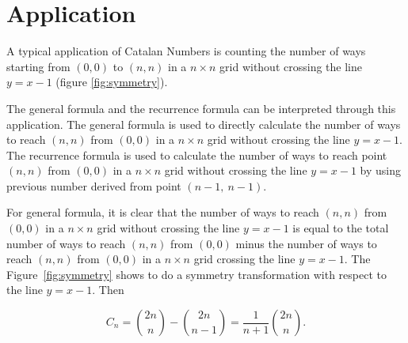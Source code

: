 \section{Application}

A typical application of Catalan Numbers is counting the number of ways starting from $(0, 0)$ to $(n, n)$ in a $n \times n$ grid without crossing the line $y = x-1$  (figure \ref*{fig:symmetry}).


The general formula and the recurrence formula can be interpreted through this application. The general formula is used to directly calculate the number of ways to reach $(n, n)$ from $(0, 0)$ in a $n \times n$ grid without crossing the line $y = x-1$. The recurrence formula is used to calculate the number of ways to reach point $(n, n)$ from $(0, 0)$ in a $n \times n$ grid without crossing the line $y = x-1$ by using previous number derived from point $(n-1, \ n-1)$.

For general formula, it is clear that the number of ways to reach $(n, n)$ from $(0, 0)$ in a $n \times n$ grid without crossing the line $y = x-1$ is equal to the total number of ways to reach $(n, n)$ from $(0, 0)$ minus the number of ways to reach $(n, n)$ from $(0, 0)$ in a $n \times n$ grid crossing the line $y = x-1$. The Figure~\ref{fig:symmetry} shows to do a symmetry transformation with respect to the line $y = x-1$. Then

\begin{equation}
    C_n = \binom{2n}{n} - \binom{2n}{n-1} = \frac{1}{n+1}\binom{2n}{n}.
\end{equation}

